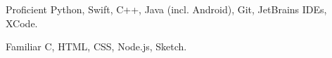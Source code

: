 
\begin{cvskills}

	\cvskill
	{Proficient} %
	{Python, Swift, C++, Java (incl. Android), Git, JetBrains IDEs, XCode.} %

	\cvskill
	{Familiar} %
	{C, HTML, CSS, Node.js, Sketch.} %


    

\end{cvskills}
